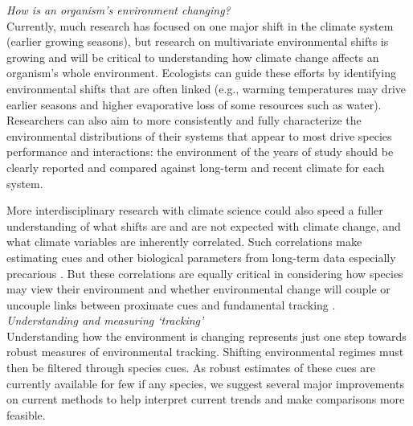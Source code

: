 \documentclass[11pt,letterpaper]{article}
\begin{document}
\emph{How is an organism's environment changing?} \\ 
Currently, much research has focused on one major shift in the climate system (earlier growing seasons), but research on multivariate environmental shifts is growing and will be critical to understanding how climate change affects an organism's whole environment. Ecologists can guide these efforts by identifying environmental shifts that are often linked (e.g., warming temperatures may drive earlier seasons and higher evaporative loss of some resources such as water). Researchers can also aim to more consistently and fully characterize the environmental distributions of their systems that appear to most drive species performance and interactions: the environment of the years of study should be clearly reported and compared against long-term and recent climate for each system. 

More interdisciplinary research with climate science could also speed a fuller understanding of what shifts are and are not expected with climate change, and what climate variables are inherently correlated. Such correlations make estimating cues and other biological parameters from long-term data especially precarious \citep{tansey2017}. But these correlations are equally critical in considering how species may view their environment and whether environmental change will couple or uncouple links between proximate cues and fundamental tracking \citep{bonamour2019}. \\

\emph{Understanding and measuring `tracking'} \\
Understanding how the environment is changing represents just one step towards robust measures of environmental tracking. Shifting environmental regimes must then be filtered through species cues. As robust estimates of these cues are currently available for few if any species, we suggest several major improvements on current methods to help interpret current trends and make comparisons more feasible. 
\end{document}
